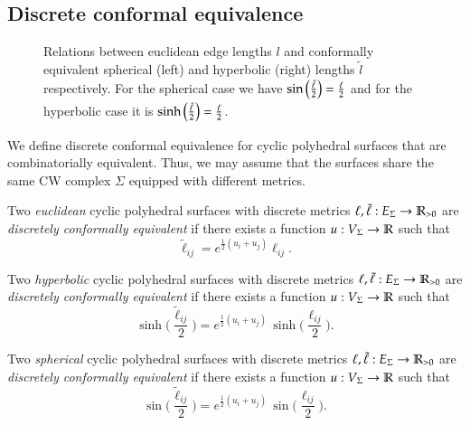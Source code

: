 \documentclass[Thesis]{subfiles}
\begin{document}
\subsection{Discrete conformal equivalence}
\label{sec:discr-conf-equiv}

\begin{figure}
\centering
\resizebox{0.6\textwidth}{!}{


}
\caption{
Relations between euclidean edge lengths $l$ and conformally equivalent spherical (left) and hyperbolic (right) lengths $\tilde l$ respectively. 
For the spherical case we have $\sin\Big(\frac{\tilde{\ell}}{2}\Big)=\frac{\ell}{2}$ and for the hyperbolic case it is $\sinh\Big(\frac{\tilde{\ell}}{2}\Big)=\frac{\ell}{2}$.
}
\label{fig:geometries}
\end{figure}


We define discrete conformal equivalence for cyclic polyhedral surfaces that are combinatorially equivalent. Thus, we may assume that the surfaces share the same CW complex $\Sigma$ equipped with different metrics.

Two \emph{euclidean} cyclic polyhedral surfaces with discrete metrics $\ell,\tilde\ell:E_{\Sigma}\rightarrow\mathbb R_{>0}$ are \emph{discretely conformally equivalent} if there exists a function $u:V_{\Sigma}\rightarrow\mathbb R$ such that
\begin{equation}
\label{eq:tilde_ell_euc}
\tilde\ell_\mathit{ij}=e^{\frac{1}{2}(u_{i}+u_{j})}\ell_\mathit{ij}.
\end{equation}

Two \emph{hyperbolic} cyclic polyhedral surfaces with discrete metrics $\ell,\tilde\ell:E_{\Sigma}\rightarrow\mathbb R_{>0}$ are \emph{discretely conformally equivalent} if there exists a function $u:V_{\Sigma}\rightarrow\mathbb R$ such that
\begin{equation}
\label{eq:tilde_ell_hyp}
\sinh\Big(\frac{\tilde\ell_\mathit{ij}}{2}\Big)
= e^{\frac{1}{2}(u_{i}+u_{j})}\,
\sinh\Big(\frac{\ell_\mathit{ij}}{2}\Big).
\end{equation}


Two \emph{spherical} cyclic polyhedral surfaces with discrete metrics $\ell,\tilde\ell:E_{\Sigma}\rightarrow\mathbb R_{>0}$ are \emph{discretely conformally equivalent} if there exists a function $u:V_{\Sigma}\rightarrow\mathbb R$ such that
\begin{equation}
\label{eq:tilde_ell_sph}
\sin\Big(\frac{\tilde\ell_\mathit{ij}}{2}\Big)
= e^{\frac{1}{2}(u_{i}+u_{j})}\,
\sin\Big(\frac{\ell_\mathit{ij}}{2}\Big).
\end{equation}
\end{document}
